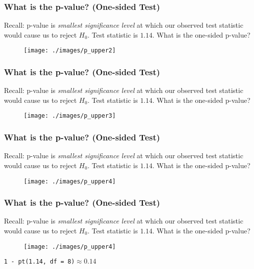 \documentclass{beamer}
\begin{document}
\begin{frame}
\frametitle{What is the p-value? (One-sided Test)}
\footnotesize
Recall: p-value is \emph{smallest significance level} at which our observed test statistic would cause us to reject $H_0$. \alert{Test statistic is $1.14$. What is the one-sided p-value? }
\begin{figure}
\texttt{[image: ./images/p\_upper2]}

\end{figure}

\end{frame}

\begin{frame}
\frametitle{What is the p-value? (One-sided Test)}
\footnotesize
Recall: p-value is \emph{smallest significance level} at which our observed test statistic would cause us to reject $H_0$. \alert{Test statistic is $1.14$. What is the one-sided p-value? }
\begin{figure}
\texttt{[image: ./images/p\_upper3]}

\end{figure}

\end{frame}

\begin{frame}
\frametitle{What is the p-value? (One-sided Test)}
\footnotesize
Recall: p-value is \emph{smallest significance level} at which our observed test statistic would cause us to reject $H_0$. \alert{Test statistic is $1.14$. What is the one-sided p-value? }
\begin{figure}
\texttt{[image: ./images/p\_upper4]}

\end{figure}

\end{frame}

\begin{frame}
\frametitle{What is the p-value? (One-sided Test)}
\footnotesize
Recall: p-value is \emph{smallest significance level} at which our observed test statistic would cause us to reject $H_0$. \alert{Test statistic is $1.14$. What is the one-sided p-value? }
\begin{figure}
\texttt{[image: ./images/p\_upper4]}

\end{figure}
\texttt{1 - pt(1.14, df = 8)}$\approx 0.14$
\end{frame}
\end{document}
